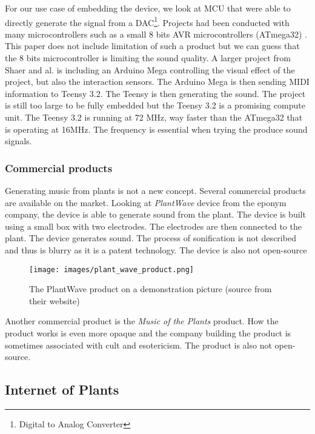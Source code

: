 For our use case of embedding the device, we look at MCU that were able to directly generate the signal
from a DAC\footnote{Digital to Analog Converter}. Projects had been conducted with many microcontrollers such as a small
8 bits AVR microcontrollers (ATmega32) \cite{hussainAVRMicrocontrollerImplementation2011}. This paper does not include limitation of
such a product but we can guess that the 8 bits microcontroller is limiting the sound quality. A larger project from Shaer and al.
\cite{shaerInteractiveCapacitiveTouch2020} is including an Arduino Mega controlling the visual effect of the project,
but also the interaction sensors. The Arduino Mega is then sending MIDI information to Teensy 3.2. The Teensy is then
generating the sound. The project is still too large to be fully embedded but the Teensy 3.2 is a promising compute unit.
The Teensy 3.2 is running at 72 MHz, way faster than the ATmega32 that is operating at 16MHz. The frequency is essential
when trying the produce sound signals.


\subsubsection{Commercial products}

Generating music from plants is not a new concept. Several commercial products are available on the market.
Looking at \textit{PlantWave} device from the eponym company, the device is able to generate sound from the plant. The device is
built using a small box with two electrodes. The electrodes are then connected to the plant. The device generates sound.
The process of sonification is not described and thus is blurry as it is a patent technology. The device is also not open-source

\begin{figure}[h!]
    \centering
    \texttt{[image: images/plant\_wave\_product.png]}
    \caption{The PlantWave product on a demonstration picture (source from their website)}
    \vspace{0.1cm}
    \label{fig:plant_wave_product}
\end{figure}

Another commercial product is the \textit{Music of the Plants} product. How the product works is even more opaque and the company building the product
is sometimes associated with cult and esotericism. The product is also not open-source.


\subsection{Internet of Plants}

